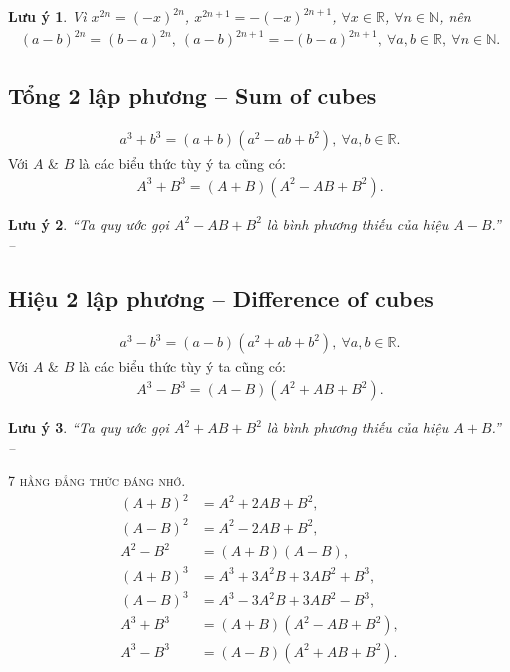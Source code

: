 \documentclass[oneside]{book}
\numberwithin{equation}{section}
\newtheorem{luuy}{Lưu ý}[section]
\begin{document}
\begin{luuy}
	Vì $x^{2n} = (-x)^{2n}$, $x^{2n + 1} = -(-x)^{2n + 1}$, $\forall x\in\mathbb{R}$, $\forall n\in\mathbb{N}$, nên
	\begin{align*}
		(a - b)^{2n} = (b - a)^{2n},\ (a - b)^{2n + 1} = -(b - a)^{2n + 1},\ \forall a,b\in\mathbb{R},\ \forall n\in\mathbb{N}.
	\end{align*}
\end{luuy}

\subsection{Tổng 2 lập phương -- Sum of cubes}
\begin{align}
	\label{sum of cubes}
	a^3 + b^3 = (a + b)(a^2 - ab + b^2),\ \forall a,b\in\mathbb{R}.
\end{align}
Với $A$ \& $B$ là các biểu thức tùy ý ta cũng có:
\begin{align*}
	A^3 + B^3 = (A + B)(A^2 - AB + B^2).
\end{align*}

\begin{luuy}
	``Ta quy ước gọi $A^2 - AB + B^2$ là \emph{bình phương thiếu của hiệu $A - B$}.'' -- \cite[p. 15]{SGK_Toan_8_tap_1}
\end{luuy}

\subsection{Hiệu 2 lập phương -- Difference of cubes}
\begin{align}
	\label{sum of cubes}
	a^3 - b^3 = (a - b)(a^2 + ab + b^2),\ \forall a,b\in\mathbb{R}.
\end{align}
Với $A$ \& $B$ là các biểu thức tùy ý ta cũng có:
\begin{align*}
	A^3 - B^3 = (A - B)(A^2 + AB + B^2).
\end{align*}

\begin{luuy}
	``Ta quy ước gọi $A^2 + AB + B^2$ là \emph{bình phương thiếu của hiệu $A + B$}.'' -- \cite[p. 15]{SGK_Toan_8_tap_1}
\end{luuy}

\begin{tcolorbox}
	\centering
	\textsc{7 hằng đẳng thức đáng nhớ.}
	\begin{align*}
			(A + B)^2 &= A^2 + 2AB + B^2,\\
			(A - B)^2 &= A^2 - 2AB + B^2,\\
			A^2 - B^2 &= (A + B)(A - B),\\
			(A + B)^3 &= A^3 + 3A^2B + 3AB^2 + B^3,\\
			(A - B)^3 &= A^3 - 3A^2B + 3AB^2 - B^3,\\
			A^3 + B^3 &= (A + B)(A^2 - AB + B^2),\\
			A^3 - B^3 &= (A - B)(A^2 + AB + B^2).
	\end{align*}
\end{tcolorbox}
\end{document}
